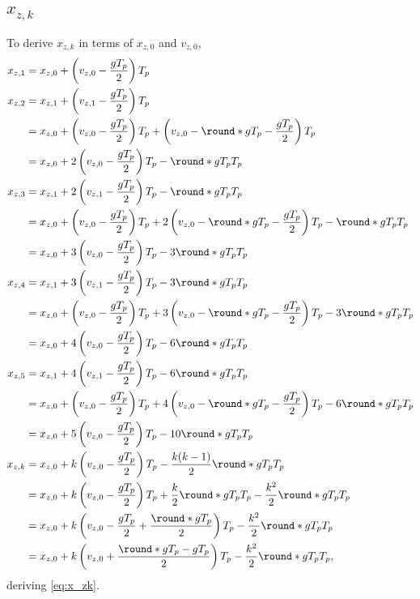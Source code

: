 \subsection{\texorpdfstring{$x_{z,k}$}{x\_z k}}
\label{app:derive_x_zk}
To derive $x_{z,k}$ in terms of $x_{z,0}$ and $v_{z,0}$,
\begin{align*}
x_{z,1} &= x_{z,0} + \left(v_{z,0} - \frac{gT_p}{2} \right) T_p\\
x_{z,2} &= x_{z,1} + \left(v_{z,1} - \frac{gT_p}{2} \right) T_p\\
&= x_{z,0} + \left(v_{z,0} - \frac{gT_p}{2} \right) T_p + \left(v_{z,0} - \round*{gT_p} - \frac{gT_p}{2} \right) T_p\\
&= x_{z,0} + 2\left(v_{z,0} - \frac{gT_p}{2} \right) T_p - \round*{gT_p} T_p\\
x_{z,3} &= x_{z,1} + 2\left(v_{z,1} - \frac{gT_p}{2} \right) T_p - \round*{gT_p} T_p\\
&= x_{z,0} + \left(v_{z,0} - \frac{gT_p}{2} \right) T_p + 2\left(v_{z,0} - \round*{gT_p} - \frac{gT_p}{2} \right) T_p - \round*{gT_p} T_p\\
&= x_{z,0} + 3\left(v_{z,0} - \frac{gT_p}{2} \right) T_p - 3\round*{gT_p} T_p\\
x_{z,4} &= x_{z,1} + 3\left(v_{z,1} - \frac{gT_p}{2} \right) T_p - 3\round*{gT_p} T_p\\
&= x_{z,0} + \left(v_{z,0} - \frac{gT_p}{2} \right) T_p + 3\left(v_{z,0} - \round*{gT_p} - \frac{gT_p}{2} \right) T_p - 3\round*{gT_p} T_p\\
&= x_{z,0} + 4\left(v_{z,0} - \frac{gT_p}{2} \right) T_p - 6\round*{gT_p} T_p\\
x_{z,5} &= x_{z,1} + 4\left(v_{z,1} - \frac{gT_p}{2} \right) T_p - 6\round*{gT_p} T_p\\
&= x_{z,0} + \left(v_{z,0} - \frac{gT_p}{2} \right) T_p + 4\left(v_{z,0} - \round*{gT_p} - \frac{gT_p}{2} \right) T_p - 6\round*{gT_p} T_p\\
&= x_{z,0} + 5\left(v_{z,0} - \frac{gT_p}{2} \right) T_p - 10\round*{gT_p} T_p\\
x_{z,k} &= x_{z,0} + k\left(v_{z,0} - \frac{gT_p}{2} \right) T_p - \frac{k(k - 1)}{2} \round*{gT_p} T_p\\
&= x_{z,0} + k\left(v_{z,0} - \frac{gT_p}{2} \right) T_p + \frac{k}{2} \round*{gT_p} T_p - \frac{k^2}{2} \round*{gT_p} T_p\\
&= x_{z,0} + k\left(v_{z,0} - \frac{gT_p}{2} + \frac{\round*{gT_p}}{2} \right) T_p - \frac{k^2}{2} \round*{gT_p} T_p\\
&= x_{z,0} + k\left(v_{z,0} + \frac{\round*{gT_p} - gT_p}{2} \right) T_p - \frac{k^2}{2} \round*{gT_p} T_p,
\end{align*}
deriving \eqref{eq:x_zk}.
